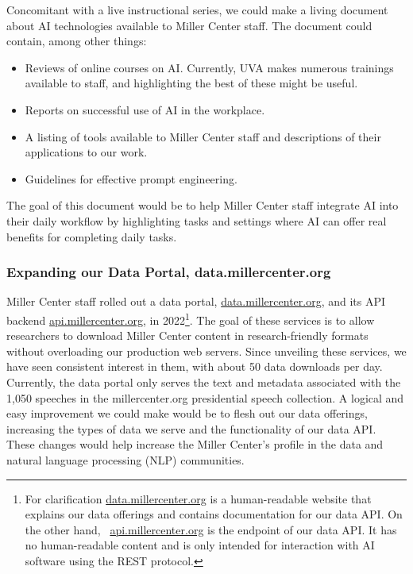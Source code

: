 \documentclass[12pt, oneside]{article}   	%
\begin{document}
Concomitant with a live instructional series, we could make a living document about AI technologies available to Miller Center staff.  The document could contain, among other things:
\begin{itemize}
\item Reviews of online courses on AI.  Currently, UVA makes numerous trainings available to staff, and highlighting the best of these might be useful.
\item Reports on successful use of AI in the workplace.
\item A listing of tools available to Miller Center staff and descriptions of their applications to our work.
\item Guidelines for effective prompt engineering.
\end{itemize}
The goal of this document would be to help Miller Center staff integrate AI into their daily workflow by highlighting tasks and settings where AI can offer real benefits for completing daily tasks.







\subsubsection{Expanding our Data Portal, data.millercenter.org}\label{section.applications.easy.data-portal}
Miller Center staff rolled out a data portal, \href{https://data.millercenter.org}{data.millercenter.org}, and its API backend \href{https://api.millercenter.org}{api.millercenter.org}, in 2022\footnote{For clarification \href{https://data.millercenter.org}{data.millercenter.org} is a human-readable website that explains our data offerings and contains documentation for our data API.  On the other hand, \ \href{https://api.millercenter.org}{api.millercenter.org} is the endpoint of our data API.  It has no human-readable content and is only intended for interaction with AI software using the REST protocol.}.  The goal of these services is to allow researchers to download Miller Center content in research-friendly formats without overloading our production web servers.  Since unveiling these services, we have seen consistent interest in them, with about 50 data downloads per day.  Currently, the data portal only serves the text and  metadata associated with the 1,050 speeches in the millercenter.org presidential speech collection.   A logical and easy improvement we could make would be to flesh out our data offerings, increasing the types of data we serve and the functionality of our data API.  These changes would help increase the Miller Center's profile in the data and natural language processing (NLP) communities.
\end{document}
